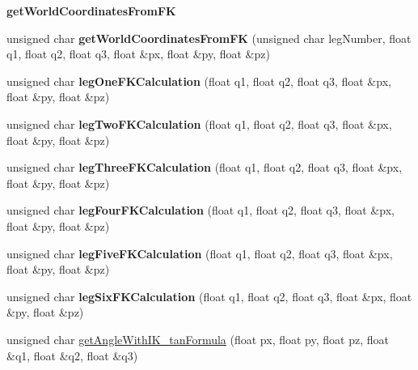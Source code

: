 \begin{Indent}\textbf{ get\+World\+Coordinates\+From\+FK}\par
\begin{DoxyCompactItemize}
\item 
\mbox{\label{class_movement_controller_a252a8052b283372152f3376ea0aee55b}} 
unsigned char {\bfseries get\+World\+Coordinates\+From\+FK} (unsigned char leg\+Number, float q1, float q2, float q3, float \&px, float \&py, float \&pz)
\item 
\mbox{\label{class_movement_controller_a3c86e9f08423c5662e2134736160d539}} 
unsigned char {\bfseries leg\+One\+F\+K\+Calculation} (float q1, float q2, float q3, float \&px, float \&py, float \&pz)
\item 
\mbox{\label{class_movement_controller_ad1349ca3157f098be97571752e55d734}} 
unsigned char {\bfseries leg\+Two\+F\+K\+Calculation} (float q1, float q2, float q3, float \&px, float \&py, float \&pz)
\item 
\mbox{\label{class_movement_controller_a30eeaacb6e169c727c4892c65fd2580f}} 
unsigned char {\bfseries leg\+Three\+F\+K\+Calculation} (float q1, float q2, float q3, float \&px, float \&py, float \&pz)
\item 
\mbox{\label{class_movement_controller_ab5811a162191979ea4815219fa9709e9}} 
unsigned char {\bfseries leg\+Four\+F\+K\+Calculation} (float q1, float q2, float q3, float \&px, float \&py, float \&pz)
\item 
\mbox{\label{class_movement_controller_aa1c69d5fe2c7e17ba23de283f85c38a2}} 
unsigned char {\bfseries leg\+Five\+F\+K\+Calculation} (float q1, float q2, float q3, float \&px, float \&py, float \&pz)
\item 
\mbox{\label{class_movement_controller_ab342cee1b0fec3faed3e98c23f50d941}} 
unsigned char {\bfseries leg\+Six\+F\+K\+Calculation} (float q1, float q2, float q3, float \&px, float \&py, float \&pz)
\item 
unsigned char \mbox{\hyperlink{class_movement_controller_a5765726eb4e820a7ac669c88fe4937e7}{get\+Angle\+With\+I\+K\+\_\+tan\+Formula}} (float px, float py, float pz, float \&q1, float \&q2, float \&q3)

\end{DoxyCompactItemize}
\end{Indent}

